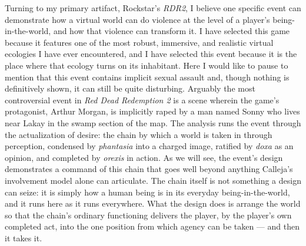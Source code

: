 Turning to my primary artifact, Rockstar's \textit{RDR2}, I believe one specific event can demonstrate how a virtual world can do violence at the level of a player's being-in-the-world, and how that violence can transform it. I have selected this game because it features one of the most robust, immersive, and realistic virtual ecologies I have ever encountered, and I have selected this event because it is the place where that ecology turns on its inhabitant. Here I would like to pause to mention that this event contains implicit sexual assault and, though nothing is definitively shown, it can still be quite disturbing. Arguably the most controversial event in \textit{Red Dead Redemption 2} is a scene wherein the game's protagonist, Arthur Morgan, is implicitly raped by a man named Sonny who lives near Lakay in the swamp section of the map. The analysis runs the event through the actualization of desire: the chain by which a world is taken in through perception, condensed by \textit{phantasia} into a charged image, ratified by \textit{doxa} as an opinion, and completed by \textit{orexis} in action. As we will see, the event's design demonstrates a command of this chain that goes well beyond anything Calleja's involvement model alone can articulate. The chain itself is not something a design can seize: it is simply how a human being is in its everyday being-in-the-world, and it runs here as it runs everywhere. What the design does is arrange the world so that the chain's ordinary functioning delivers the player, by the player's own completed act, into the one position from which agency can be taken --- and then it takes it.

